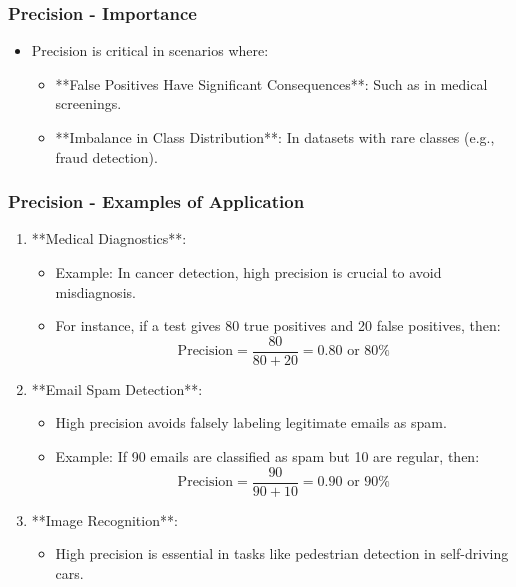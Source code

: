 \documentclass[aspectratio=169]{beamer}
\begin{document}
\begin{frame}[fragile]
    \frametitle{Precision - Importance}
    \begin{itemize}
        \item Precision is critical in scenarios where:
            \begin{itemize}
                \item **False Positives Have Significant Consequences**: Such as in medical screenings.
                \item **Imbalance in Class Distribution**: In datasets with rare classes (e.g., fraud detection).
            \end{itemize}
    \end{itemize}
\end{frame}

\begin{frame}[fragile]
    \frametitle{Precision - Examples of Application}
    \begin{enumerate}
        \item **Medical Diagnostics**:
            \begin{itemize}
                \item Example: In cancer detection, high precision is crucial to avoid misdiagnosis.
                \item For instance, if a test gives 80 true positives and 20 false positives, then:
                \begin{equation}
                    \text{Precision} = \frac{80}{80 + 20} = 0.80 \text{ or } 80\%
                \end{equation}
            \end{itemize}

        \item **Email Spam Detection**:
            \begin{itemize}
                \item High precision avoids falsely labeling legitimate emails as spam.
                \item Example: If 90 emails are classified as spam but 10 are regular, then:
                \begin{equation}
                    \text{Precision} = \frac{90}{90 + 10} = 0.90 \text{ or } 90\%
                \end{equation}
            \end{itemize}

        \item **Image Recognition**:
            \begin{itemize}
                \item High precision is essential in tasks like pedestrian detection in self-driving cars.
            \end{itemize}
    \end{enumerate}
\end{frame}
\end{document}
